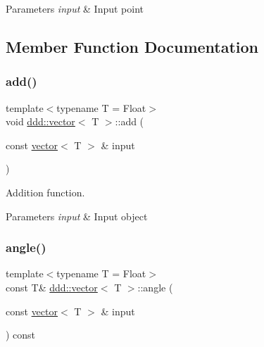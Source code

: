 \begin{DoxyParams}{Parameters}
{\em input} & Input point \\
\hline
\end{DoxyParams}


\subsection{Member Function Documentation}
\mbox{\label{classddd_1_1vector_a97eca6a6625002022ab2442b5cbd0462}} 
\subsubsection{\texorpdfstring{add()}{add()}}
{\footnotesize\ttfamily template$<$typename T = Float$>$ \\
void \hyperlink{classddd_1_1vector}{ddd\+::vector}$<$ T $>$\+::add (\begin{DoxyParamCaption}\item[{const \hyperlink{classddd_1_1vector}{vector}$<$ T $>$ \&}]{input }\end{DoxyParamCaption})\hspace{0.3cm}{\ttfamily [inline]}}



Addition function. 


\begin{DoxyParams}{Parameters}
{\em input} & Input object \\
\hline
\end{DoxyParams}
\mbox{\label{classddd_1_1vector_ad1a37ce1d1c20c227257fd1fd223c3cf}} 
\subsubsection{\texorpdfstring{angle()}{angle()}\hspace{0.1cm}{\footnotesize\ttfamily [1/5]}}
{\footnotesize\ttfamily template$<$typename T = Float$>$ \\
const T\& \hyperlink{classddd_1_1vector}{ddd\+::vector}$<$ T $>$\+::angle (\begin{DoxyParamCaption}\item[{const \hyperlink{classddd_1_1vector}{vector}$<$ T $>$ \&}]{input }\end{DoxyParamCaption}) const\hspace{0.3cm}{\ttfamily [inline]}}



